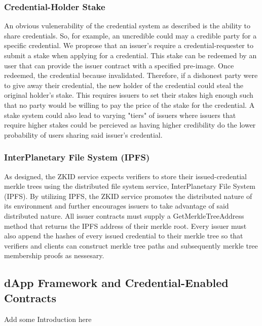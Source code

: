 \documentclass[11 pt]{extarticle}
\theoremstyle{remark}
\begin{document}
\subsubsection{Credential-Holder Stake}

An obvious vulenerability of the credential system as described is the ability to share credentials. So, for example, an uncredible could may
a credible party for a specific credential. We proprose that an issuer's require a credential-requester to submit a stake when 
applying for a credential. This stake can be redeemed by an user that can provide the issuer contract with a specified pre-image. Once 
redeemed, the credential because invalidated. Therefore, if a dishonest party were to give away their credential, the new holder of the credential
could steal the original holder's stake. This requires issuers to set their stakes high enough such that no party would be willing to pay the
price of the stake for the credential. A stake system could also lead to varying "tiers" of issuers where issuers that require higher stakes could be 
percieved as having higher credibility do the lower probability of users sharing said issuer's credential.

\subsubsection{InterPlanetary File System (IPFS)}

As designed, the ZKID service expects verifiers to store their issued-credential merkle trees using the distributed file system service, InterPlanetary File System (IPFS).
By utilizing IPFS, the ZKID service promotes the distributed nature of its environment and further encourages issuers to take advantage of said distributed nature. All issuer
contracts must supply a GetMerkleTreeAddress method that returns the IPFS address of their merkle root. Every issuer must also append the hashes of every issued credential 
to their merkle tree so that verifiers and clients can construct merkle tree paths and subsequently merkle tree membership proofs as nessesary. 

\subsection{dApp Framework and Credential-Enabled Contracts}

Add some Introduction here
\end{document}
